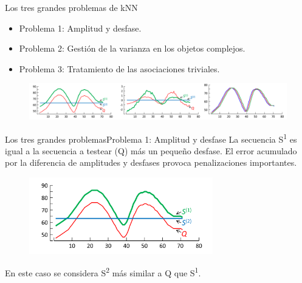 \documentclass[12pt, aspectratio=169]{beamer} %
\begin{document}
\begin{frame}{Los tres grandes problemas de kNN}

  \begin{itemize}
  \item Problema 1: Amplitud y desfase.
  \item Problema 2: Gestión de la varianza en los objetos complejos.
  \item Problema 3: Tratamiento de las asociaciones triviales.
  \end{itemize}

  \begin{figure}
    \includegraphics[width=1\textwidth]{20210313_1_tres_metricas.png}
  \end{figure}
  
\end{frame}

\begin{frame}{Los tres grandes problemas}{Problema 1: Amplitud y desfase}
  La secuencia S\textsuperscript{1} es igual a la secuencia a testear (Q) más un pequeño desfase.
  El error acumulado por la diferencia de amplitudes y desfases provoca penalizaciones importantes.

  \begin{figure}
      \includegraphics[width=8cm]{20210312_2_problema_offset.png}
      \label{fig:problema_1}
  \end{figure}
  En este caso se considera S\textsuperscript{2} más similar a Q que S\textsuperscript{1}.
\end{frame}
\end{document}
